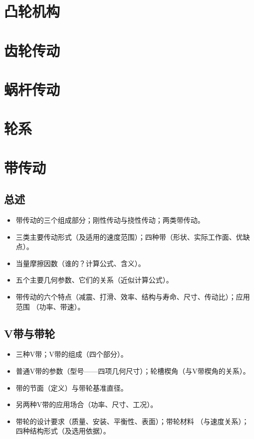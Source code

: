 \documentclass[12pt,a4paper]{article}
\newcommand{\tightlist}{\setlength{\parskip}{0pt}\setlength{\itemsep}{0pt}}
\newcommand{\hint}[1]{\textsf{（#1）}}
\newcommand{\minor}[1]{{\color{gray} #1}}
\begin{document}
\section{凸轮机构}

\section{齿轮传动}

\section{蜗杆传动}

\section{轮系}

\section{带传动}
\subsection{总述}
\begin{itemize}\tightlist
    \item 带传动的三个组成部分；刚性传动与挠性传动；两类带传动。
    \item 三类主要传动形式\hint{及适用的速度范围}；四种带\hint{形状、实际工作面、优缺点}。
    \item 当量摩擦因数\hint{谁的？计算公式、含义}。
    \item 五个主要几何参数、它们的关系\hint{近似计算公式}。
    \item 带传动的六个特点\hint{减震、打滑、效率、结构与寿命、尺寸、传动比}；应用范围
    \hint{功率、带速}。
\end{itemize}

\subsection{V带与带轮}
\begin{itemize}\tightlist
    \item 三种V带；V带的组成\hint{四个部分}。
    \item 普通V带的参数\hint{型号——四项几何尺寸}；轮槽楔角\hint{与V带楔角的关系}。
    \item 带的节面\hint{定义}与带轮基准直径。
    \item \minor{另两种V带的应用场合\hint{功率、尺寸、工况}。}
    \item \minor{带轮的设计要求\hint{质量、安装、平衡性、表面}；}带轮材料
    \hint{与速度关系}；\minor{四种结构形式\hint{及选用依据}。}
\end{itemize}
\end{document}
